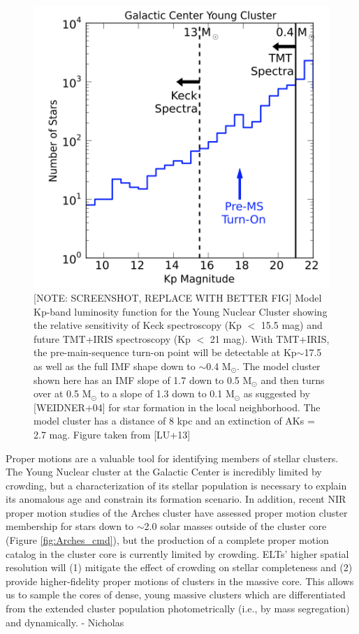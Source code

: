 \documentclass[11pt]{article}
\begin{document}
\begin{figure}
    \centering
    \includegraphics[scale=0.4]{TMT_YNC.png}
    \caption{[NOTE: SCREENSHOT, REPLACE WITH BETTER FIG] Model Kp-band luminosity function for the Young Nuclear Cluster showing the relative sensitivity of Keck spectroscopy (Kp $<$ 15.5 mag) and future TMT+IRIS spectroscopy (Kp $<$ 21 mag). With TMT+IRIS, the pre-main-sequence turn-on point will be detectable at Kp$\sim$17.5 as well as the full IMF shape down to $\sim$0.4 M$_{\odot}$. The model cluster shown here has an IMF slope of 1.7 down to 0.5 M$_{\odot}$ and then turns over at 0.5 M$_{\odot}$ to a slope of 1.3 down to 0.1 M$_{\odot}$ as suggested by [WEIDNER+04] for star formation in the local neighborhood. The model cluster has a distance of 8 kpc and an extinction of AKs = 2.7 mag.
    Figure taken from [LU+13]}
    \label{fig:TMT_YNC}
\end{figure}


Proper motions are a valuable tool for identifying members of stellar clusters. The Young Nuclear cluster at the Galactic Center is incredibly limited by crowding, but a characterization of its stellar population is necessary to explain its anomalous age and constrain its formation scenario. In addition, recent NIR proper motion studies of the Arches cluster have assessed proper motion cluster membership for stars down to $\sim$2.0 solar masses outside of the cluster core (Figure \ref{fig:Arches_cmd}), but the production of a complete proper motion catalog in the cluster core is currently limited by crowding. ELTs’ higher spatial resolution will (1) mitigate the effect of crowding on stellar completeness and (2) provide higher-fidelity proper motions of clusters in the massive core. This allows us to sample the cores of dense, young massive clusters which are differentiated from the extended cluster population photometrically (i.e., by mass segregation) and dynamically.   - Nicholas
\end{document}
